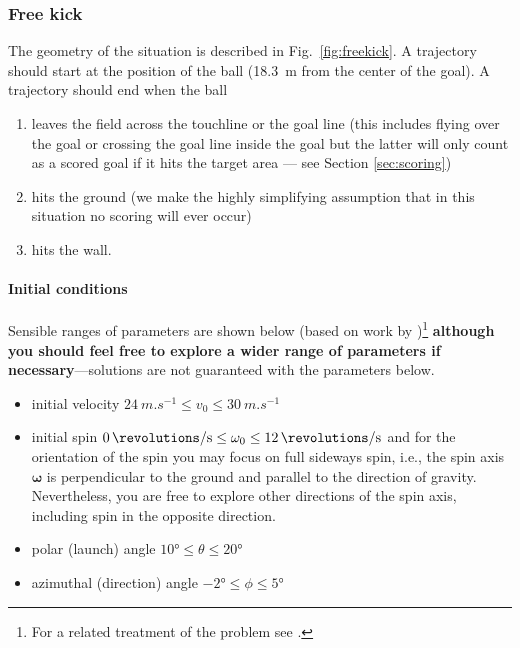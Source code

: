\documentclass[letterpaper]{scrartcl}
\begin{document}
\subsubsection{Free kick}
\label{sec:freekick}

The geometry of the situation is described in
Fig.~\ref{fig:freekick}. A trajectory should start at the position of
the ball (\SI{18.3}{m} from the center of the goal). A trajectory
should end when the ball
\begin{enumerate}
\item leaves the field across the touchline or the goal line (this
  includes flying over the goal or crossing the goal line inside the
  goal but the latter will only count as a scored goal if it hits the
  target area --- see Section \ref{sec:scoring})
\item hits the ground (we make the highly simplifying assumption that
  in this situation no scoring will ever occur)
\item hits the wall.
\end{enumerate}


\paragraph{Initial conditions}

Sensible ranges of parameters are shown below (based on work by
\citet{Cook:2006aa})\footnote{For a related treatment of the problem
  see \citet{Bray:2003aa}.}  \textbf{although you should feel free to
  explore a wider range of parameters if necessary}---solutions are
not guaranteed with the parameters below.
\begin{itemize}
\item initial velocity $\SI{24}{m.s^{-1}} \le v_{0} \le \SI{30}{m.s^{-1}}$
\item initial spin
  $\SI{0}{\revolutions\per\second} \le \omega_{0} \le
  \SI{12}{\revolutions\per\second}$ and for the orientation of the
  spin you may focus on full sideways spin, i.e., the spin axis
  $\boldsymbol{\omega}$ is perpendicular to the ground and parallel to
  the direction of gravity. Nevertheless, you are free to explore
  other directions of the spin axis, including spin in the opposite
  direction.
\item polar (launch) angle $\ang{10} \le \theta \le \ang{20}$
\item azimuthal (direction) angle $\ang{-2} \le \phi \le \ang{5}$
\end{itemize}
\end{document}
